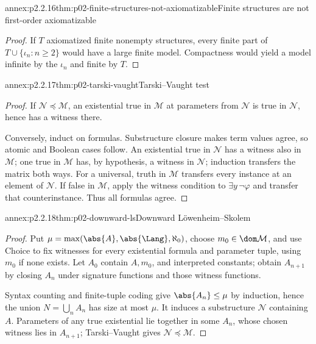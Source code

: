 \begin{annexitem}{annex:p2.2.16}{thm:p02-finite-structures-not-axiomatizable}{Finite structures are not first-order axiomatizable}
\begin{proof}
If \(T\) axiomatized finite nonempty structures, every finite part of
\(T\cup\{\iota_n:n\geq2\}\) would have a large finite model.  Compactness
would yield a model infinite by the \(\iota_n\) and finite by \(T\).
\end{proof}
\end{annexitem}

\begin{annexitem}{annex:p2.2.17}{thm:p02-tarski-vaught}{Tarski--Vaught test}
\begin{proof}
If \(\mathcal N\preccurlyeq\mathcal M\), an existential true in
\(\mathcal M\) at parameters from \(\mathcal N\) is true in
\(\mathcal N\), hence has a witness there.

Conversely, induct on formulas.  Substructure closure makes term values agree,
so atomic and Boolean cases follow.  An existential true in \(\mathcal N\)
has a witness also in \(\mathcal M\); one true in \(\mathcal M\) has, by
hypothesis, a witness in \(\mathcal N\); induction transfers the matrix both
ways.  For a universal, truth in \(\mathcal M\) transfers every instance at
an element of \(\mathcal N\).  If false in \(\mathcal M\), apply the witness
condition to \(\exists y\,\neg\varphi\) and transfer that counterinstance.
Thus all formulas agree.
\end{proof}
\end{annexitem}

\begin{annexitem}{annex:p2.2.18}{thm:p02-downward-ls}{Downward L\"owenheim--Skolem}
\begin{proof}
Put \(\mu=\max(\abs{A},\abs{\Lang},\aleph_0)\), choose
\(m_0\in\dom\mathcal M\), and use Choice to fix witnesses for every
existential formula and parameter tuple, using \(m_0\) if none exists.  Let
\(A_0\) contain \(A,m_0\), and interpreted constants; obtain \(A_{n+1}\)
by closing \(A_n\) under signature functions and those witness functions.

Syntax counting and finite-tuple coding give \(\abs{A_n}\leq\mu\) by
induction, hence the union \(N=\bigcup_nA_n\) has size at most \(\mu\).
It induces a substructure \(\mathcal N\) containing \(A\).  Parameters of
any true existential lie together in some \(A_n\), whose chosen witness lies
in \(A_{n+1}\); Tarski--Vaught gives
\(\mathcal N\preccurlyeq\mathcal M\).
\end{proof}
\end{annexitem}

